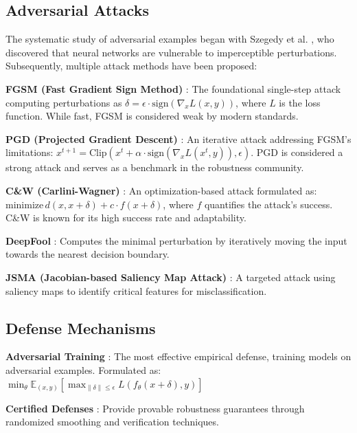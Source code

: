 \documentclass[10pt,conference]{IEEEtran}
\begin{document}
\subsection{Adversarial Attacks}

The systematic study of adversarial examples began with Szegedy et al. \cite{szegedy2013intriguing}, who discovered that neural networks are vulnerable to imperceptible perturbations. Subsequently, multiple attack methods have been proposed:

\textbf{FGSM (Fast Gradient Sign Method)} \cite{goodfellow2014explaining}: The foundational single-step attack computing perturbations as $\delta = \epsilon \cdot \text{sign}(\nabla_x L(x, y))$, where $L$ is the loss function. While fast, FGSM is considered weak by modern standards.

\textbf{PGD (Projected Gradient Descent)} \cite{madry2018towards}: An iterative attack addressing FGSM's limitations: $x^{t+1} = \text{Clip}(x^t + \alpha \cdot \text{sign}(\nabla_x L(x^t, y)), \epsilon)$. PGD is considered a strong attack and serves as a benchmark in the robustness community.

\textbf{C\&W (Carlini-Wagner)} \cite{carlini2016towards}: An optimization-based attack formulated as: $\text{minimize} \, d(x, x+\delta) + c \cdot f(x+\delta)$, where $f$ quantifies the attack's success. C\&W is known for its high success rate and adaptability.

\textbf{DeepFool} \cite{moosavidezfooli2016deepfool}: Computes the minimal perturbation by iteratively moving the input towards the nearest decision boundary.

\textbf{JSMA (Jacobian-based Saliency Map Attack)} \cite{papernot2016jacobian}: A targeted attack using saliency maps to identify critical features for misclassification.

\subsection{Defense Mechanisms}

\textbf{Adversarial Training} \cite{madry2018towards}: The most effective empirical defense, training models on adversarial examples. Formulated as: $\min_\theta \mathbb{E}_{(x,y)} \left[ \max_{\|\delta\| \leq \epsilon} L(f_\theta(x+\delta), y) \right]$

\textbf{Certified Defenses} \cite{cohen2019certified}: Provide provable robustness guarantees through randomized smoothing and verification techniques.
\end{document}
